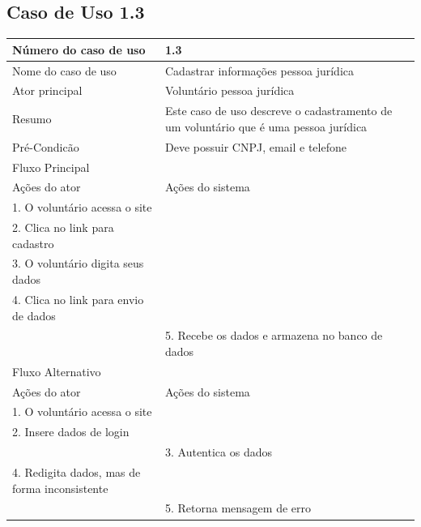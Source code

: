 


\newpage

  \subsection{Caso de Uso 1.3}
    \begin{table}[h]
    \begin{center}
    \begin{tabular}{|p{5cm}|p{10cm}|}
      \hline
      Número do caso de uso & 1.3\\
      \hline
      Nome do caso de uso   & Cadastrar informações pessoa jurídica\\
      \hline
      Ator principal        & Voluntário pessoa jurídica\\
      \hline
      Resumo                & Este caso de uso descreve o cadastramento de um voluntário que é uma pessoa jurídica\\
      \hline
      Pré-Condicão          & Deve possuir CNPJ, email e telefone\\
      \hline
      Fluxo Principal       & \\
      \hline
      Ações do ator         & Ações do sistema\\
      \hline
      1. O voluntário acessa o site & \\
      \hline
      2. Clica no link para cadastro & \\
      \hline
      3. O voluntário digita seus dados & \\
      \hline
      4. Clica no link para envio de dados & \\
      \hline
      & 5. Recebe os dados e armazena no banco de dados\\
      \hline
      Fluxo Alternativo & \\
      \hline
      Ações do ator & Ações do sistema\\
      \hline
      1. O voluntário acessa o site & \\
      \hline
      2. Insere dados de login & \\
      \hline
       & 3. Autentica os dados\\
      \hline
      4. Redigita dados, mas de forma inconsistente & \\
      \hline
      & 5. Retorna mensagem de erro\\
      \hline
    \end{tabular}
    \end{center}
    \end{table}

